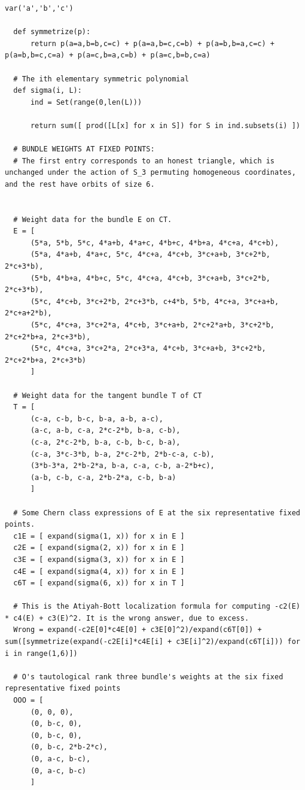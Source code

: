 \documentclass{article}
\begin{document}
\begin{lstlisting}[basicstyle=\ttfamily\tiny]  
  var('a','b','c')

  def symmetrize(p):
      return p(a=a,b=b,c=c) + p(a=a,b=c,c=b) + p(a=b,b=a,c=c) + p(a=b,b=c,c=a) + p(a=c,b=a,c=b) + p(a=c,b=b,c=a)
  
  # The ith elementary symmetric polynomial
  def sigma(i, L):
      ind = Set(range(0,len(L)))
      
      return sum([ prod([L[x] for x in S]) for S in ind.subsets(i) ])
  
  # BUNDLE WEIGHTS AT FIXED POINTS:
  # The first entry corresponds to an honest triangle, which is unchanged under the action of S_3 permuting homogeneous coordinates, and the rest have orbits of size 6.
  
  
  # Weight data for the bundle E on CT.
  E = [
      (5*a, 5*b, 5*c, 4*a+b, 4*a+c, 4*b+c, 4*b+a, 4*c+a, 4*c+b),
      (5*a, 4*a+b, 4*a+c, 5*c, 4*c+a, 4*c+b, 3*c+a+b, 3*c+2*b, 2*c+3*b),
      (5*b, 4*b+a, 4*b+c, 5*c, 4*c+a, 4*c+b, 3*c+a+b, 3*c+2*b, 2*c+3*b),
      (5*c, 4*c+b, 3*c+2*b, 2*c+3*b, c+4*b, 5*b, 4*c+a, 3*c+a+b, 2*c+a+2*b),
      (5*c, 4*c+a, 3*c+2*a, 4*c+b, 3*c+a+b, 2*c+2*a+b, 3*c+2*b, 2*c+2*b+a, 2*c+3*b),
      (5*c, 4*c+a, 3*c+2*a, 2*c+3*a, 4*c+b, 3*c+a+b, 3*c+2*b, 2*c+2*b+a, 2*c+3*b)
      ]
  
  # Weight data for the tangent bundle T of CT
  T = [
      (c-a, c-b, b-c, b-a, a-b, a-c),
      (a-c, a-b, c-a, 2*c-2*b, b-a, c-b),
      (c-a, 2*c-2*b, b-a, c-b, b-c, b-a),
      (c-a, 3*c-3*b, b-a, 2*c-2*b, 2*b-c-a, c-b),
      (3*b-3*a, 2*b-2*a, b-a, c-a, c-b, a-2*b+c),
      (a-b, c-b, c-a, 2*b-2*a, c-b, b-a)
      ]
  
  # Some Chern class expressions of E at the six representative fixed points.
  c1E = [ expand(sigma(1, x)) for x in E ]
  c2E = [ expand(sigma(2, x)) for x in E ]
  c3E = [ expand(sigma(3, x)) for x in E ]
  c4E = [ expand(sigma(4, x)) for x in E ]
  c6T = [ expand(sigma(6, x)) for x in T ]
  
  # This is the Atiyah-Bott localization formula for computing -c2(E) * c4(E) + c3(E)^2. It is the wrong answer, due to excess. 
  Wrong = expand(-c2E[0]*c4E[0] + c3E[0]^2)/expand(c6T[0]) + sum([symmetrize(expand(-c2E[i]*c4E[i] + c3E[i]^2)/expand(c6T[i])) for i in range(1,6)])
  
  # O's tautological rank three bundle's weights at the six fixed representative fixed points
  OOO = [
      (0, 0, 0),
      (0, b-c, 0),
      (0, b-c, 0),
      (0, b-c, 2*b-2*c),
      (0, a-c, b-c),
      (0, a-c, b-c)
      ]
  

\end{lstlisting}
\end{document}
